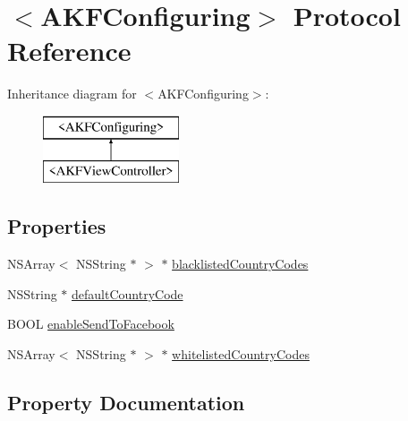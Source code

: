 \hypertarget{protocol_a_k_f_configuring-p}{}\section{$<$A\+K\+F\+Configuring$>$ Protocol Reference}
\label{protocol_a_k_f_configuring-p}
Inheritance diagram for $<$A\+K\+F\+Configuring$>$\+:\begin{figure}[H]
\begin{center}
\leavevmode
\includegraphics[height=2.000000cm]{protocol_a_k_f_configuring-p}
\end{center}
\end{figure}
\subsection*{Properties}
\begin{DoxyCompactItemize}
\item 
N\+S\+Array$<$ N\+S\+String $\ast$ $>$ $\ast$ \hyperlink{protocol_a_k_f_configuring-p_a8c2e2adfea2007af5455730501e3b6ac}{blacklisted\+Country\+Codes}
\item 
N\+S\+String $\ast$ \hyperlink{protocol_a_k_f_configuring-p_adc9db4d85fc74d5ce644cea363e52fea}{default\+Country\+Code}
\item 
B\+O\+O\+L \hyperlink{protocol_a_k_f_configuring-p_af2f10df691c36d5e6a9191e7076d65c4}{enable\+Send\+To\+Facebook}
\item 
N\+S\+Array$<$ N\+S\+String $\ast$ $>$ $\ast$ \hyperlink{protocol_a_k_f_configuring-p_af865e3330eb55455b067b14de0ff27fd}{whitelisted\+Country\+Codes}
\end{DoxyCompactItemize}


\subsection{Property Documentation}
\hypertarget{protocol_a_k_f_configuring-p_a8c2e2adfea2007af5455730501e3b6ac}{}

